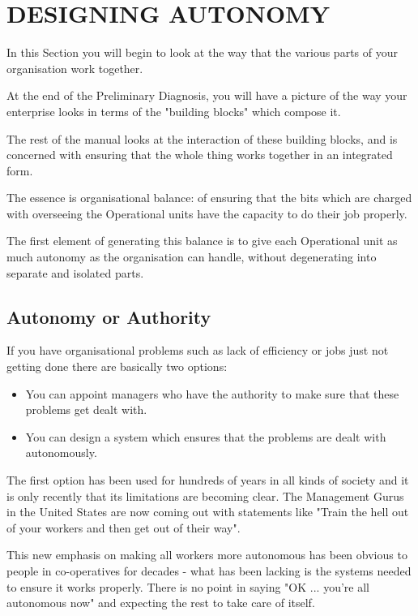 \chapter{DESIGNING AUTONOMY}\label{DESIGNING AUTONOMY}
In this Section you will begin to look at the way that the various parts of your organisation work together.

At the end of the Preliminary Diagnosis, you will have a picture of the way your enterprise looks in terms of the "building blocks" which compose it.

The rest of the manual looks at the interaction of these building blocks, and is concerned with ensuring that the whole thing works together in an integrated form.

The essence is organisational balance: of ensuring that the bits which are charged with overseeing the Operational units have the capacity to do their job properly.

The first element of generating this balance is to give each Operational unit as much autonomy as the organisation can handle, without degenerating into separate and isolated parts.

\section*{Autonomy or Authority}
If you have organisational problems such as lack of efficiency or jobs just not getting done there are basically two options:

\begin{itemize}
  \item You can appoint managers who have the authority to make sure that these problems get dealt with.

  \item You can design a system which ensures that the problems are dealt with autonomously.

\end{itemize}

The first option has been used for hundreds of years in all kinds of society and it is only recently that its limitations are becoming clear. The Management Gurus in the United States are now coming out with statements like "Train the hell out of your workers and then get out of their way".

This new emphasis on making all workers more autonomous has been obvious to people in co-operatives for decades - what has been lacking is the systems needed to ensure it works properly. There is no point in saying "OK ... you're all autonomous now" and expecting the rest to take care of itself.

